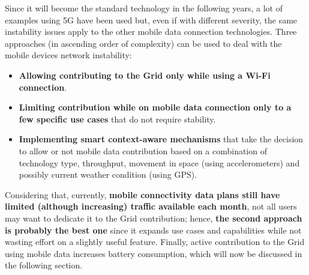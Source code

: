 Since it will become the standard technology in the following years, a lot of examples using 5G have been used  but, even if with different severity, the same instability issues apply to the other mobile data connection technologies. Three approaches (in ascending order of complexity) can be used to deal with the mobile devices network instability:
\begin{itemize}
    \item \textbf{Allowing contributing to the Grid only while using a Wi-Fi connection}.
    \item \textbf{Limiting contribution while on mobile data connection only to a few specific use cases} that do not require stability.
    \item \textbf{Implementing smart context-aware mechanisms} that take the decision to allow or not mobile data contribution based on a combination of technology type, throughput, movement in space (using accelerometers) and possibly current weather condition (using GPS).
\end{itemize}

Considering that, currently, \textbf{mobile connectivity data plans still have limited (although increasing) traffic available each month}, not all users may want to dedicate it to the Grid contribution; hence, \textbf{the second approach is probably the best one} since it expands use cases and capabilities while not wasting effort on a slightly useful feature. Finally, active contribution to the Grid using mobile data increases battery consumption, which will now be discussed in the following section.

